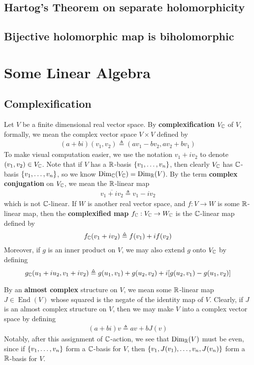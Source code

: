 \documentclass{report}
\begin{document}
\section{Hartog's Theorem on separate holomorphicity}
\section{Bijective holomorphic map is biholomorphic}
\chapter{Some Linear Algebra}
\section{Complexification}
Let $V$ be a finite dimensional real vector space. By \textbf{complexification} $V_{\mathbb{C}}$ of  $V$, formally, we mean the complex vector space $V\times V$ defined by 
\begin{align*}
  (a+b i)(v_1,v_2)\triangleq (av_1-bv_2, av_2+bv_1)
\end{align*}
To make visual computation easier, we use the notation $v_1+iv_2$  to denote $(v_1,v_2)\in V_{\mathbb{C}}$. Note that if $V$ has a $\mathbb{R}$-basis  $\{ v_1,\dots ,v_n \}$, then clearly $V_{\mathbb{C}}$ has  $\mathbb{C}$-basis  $\{ v_1,\dots ,v_n \}$, so we know $\operatorname{Dim}_{\mathbb{C}} (V_{\mathbb{C}})=\operatorname{Dim}_{\mathbb{R}} (V)$. By the term \textbf{complex conjugation} on $V_{\mathbb{C}}$, we mean the $\mathbb{R}$-linear map 
\begin{align*}
\overline{v_1+ iv_2}\triangleq v_1-iv_2
\end{align*}
which is not $\mathbb{C}$-linear. If $W$ is another real vector space, and  $f:V\rightarrow W$ is some $\mathbb{R}$-linear map, then the  \textbf{complexified map} $f_{\mathbb{C}}:V_{\mathbb{C}} \rightarrow W_{\mathbb{C}}$ is the $\mathbb{C}$-linear map defined by 
\begin{align*}
f_{\mathbb{C}}(v_1+iv_2)\triangleq f(v_1)+ if(v_2)
\end{align*}
Moreover, if $g$ is an inner product on $V$, we may also extend  $g$ onto $V_{\mathbb{C}}$ by defining 
 \begin{align*}
g_{\mathbb{C}} (u_1+iu_2, v_1+iv_2)\triangleq g(u_1,v_1)+g(u_2,v_2)+i [g(u_2,v_1)-g(u_1,v_2)]
\end{align*}


 By an \textbf{almost complex} structure on $V$, we mean some $\mathbb{R}$-linear map $J\in \operatorname{End}(V)$ whose squared is the negate of the identity map of $V$. Clearly, if $J$ is an almost complex structure on $V$, then we may make $V$ into a complex vector space by defining 
\begin{align*}
  (a+b i)v\triangleq av+bJ(v) 
\end{align*}
Notably, after this assignment of $\mathbb{C}$-action, we see that $\operatorname{Dim}_{\mathbb{R}}(V)$ must be even, since if $\{ v_1,\dots ,v_n \}$ form a $\mathbb{C}$-basis for  $V$, then  $\{ v_1,J(v_1),\dots ,v_n,J(v_n) \}$ form a $\mathbb{R}$-basis for  $V$. 
\end{document}
